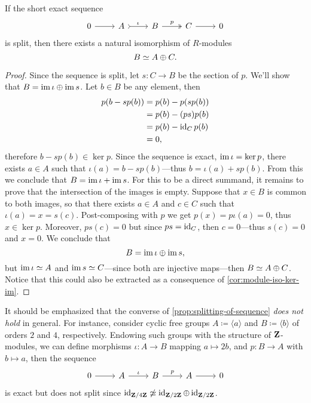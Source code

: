 \begin{proposition}
\label{prop:splitting-of-sequence}
If the short exact sequence
\[
\begin{tikzcd}
0 \ar[r] &A \ar[r, tail, "\iota"] &B \ar[r, two heads, "p"] &C \ar[r] &0
\end{tikzcd}
\]
is split, then there exists a natural isomorphism of \(R\)-modules
\[
B \simeq A \oplus C.
\]
\end{proposition}

\begin{proof}
Since the sequence is split, let \(s: C \to B\) be the section of \(p\). We'll
show that \(B = \operatorname{im} \iota \oplus \operatorname{im} s\). Let \(b \in B\) be any element, then
\begin{align*}
  p(b - sp(b))
  &= p(b) - p (s p(b)) \\
  &= p(b) - (p s) p(b) \\
  &= p(b) - \operatorname{id}_C p(b) \\
  &= 0,
\end{align*}
therefore \(b - s p(b) \in \ker p\). Since the sequence is exact,
\(\operatorname{im} \iota = \ker p\), there exists \(a \in A\) such that
\(\iota(a) = b - s p(b)\)---thus \(b = \iota(a) + s p(b)\). From this we
conclude that \(B = \operatorname{im} \iota + \operatorname{im} s\). For this to be a direct summand, it
remains to prove that the intersection of the images is empty. Suppose that
\(x \in B\) is common to both images, so that there exists \(a \in A\) and
\(c \in C\) such that \(\iota(a) = x = s(c)\). Post-composing with \(p\) we get
\(p(x) = p \iota(a) = 0\), thus \(x \in \ker p\). Moreover, \(p s(c) = 0\) but
since \(p s = \operatorname{id}_C\), then \(c = 0\)---thus \(s(c) = 0\) and \(x = 0\). We
conclude that
\[
B = \operatorname{im} \iota \oplus \operatorname{im} s,
\]
but \(\operatorname{im} \iota \simeq A\) and \(\operatorname{im} s \simeq C\)---since both are injective
maps---then \(B \simeq A \oplus C\). Notice that this could also be extracted as a
consequence of \cref{cor:module-iso-ker-im}.
\end{proof}

\begin{remark}
\label{rem:converse-of-splitting-sequence-is-false}
It should be emphasized that the converse of \cref{prop:splitting-of-sequence}
\emph{does not hold} in general.  For instance, consider cyclic free groups
\(A \coloneq \langle a \rangle\) and \(B \coloneq \langle b \rangle\) of orders
\(2\) and \(4\), respectively. Endowing such groups with the structure of
\(\mathbf{Z}\)-modules, we can define morphisms \(\iota: A \to B\) mapping
\(a \mapsto 2 b\), and \(p: B \to A\) with \(b \mapsto a\), then the sequence
\[
\begin{tikzcd}
0 \ar[r]
&A \ar[r, "\iota"]
&B \ar[r, "p"]
&A \ar[r]
&0
\end{tikzcd}
\]
is exact but does not split since
\(\operatorname{id}_{\mathbf{Z}/4\mathbf{Z}} \not\simeq \operatorname{id}_{\mathbf{Z}/2\mathbf{Z}} \oplus \operatorname{id}_{\mathbf{Z}/2\mathbf{Z}}\).
\end{remark}

